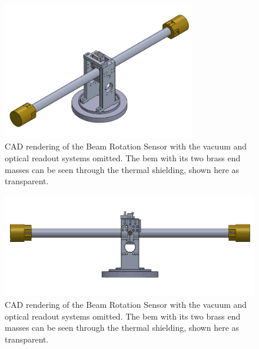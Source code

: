 \documentclass [12pt, proquest]{uwthesis}[2019]
\begin{document}
\begin{figure}
\begin{center} \includegraphics[width=0.75\textwidth]{BRSIso.png}
\caption{CAD rendering of the Beam Rotation Sensor with the vacuum and optical readout systems omitted. The bem with its two brass end masses can be seen through the thermal shielding, shown here as transparent. }
\end{center}
\end{figure} 
\begin{figure}
\begin{center} 
\includegraphics[width=\textwidth]{BRSFront.png}
\end{center}
\caption{CAD rendering of the Beam Rotation Sensor with the vacuum and optical readout systems omitted. The bem with its two brass end masses can be seen through the thermal shielding, shown here as transparent. }
\label{BRSImage}
\end{figure}
\end{document}
